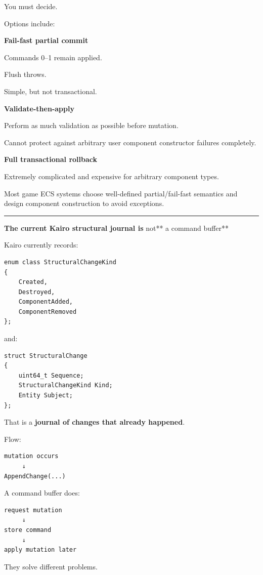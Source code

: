 You must decide.

Options include:

\textbf{Fail-fast partial commit}

Commands 0--1 remain applied.

Flush throws.

Simple, but not transactional.

\textbf{Validate-then-apply}

Perform as much validation as possible before mutation.

Cannot protect against arbitrary user component constructor failures completely.

\textbf{Full transactional rollback}

Extremely complicated and expensive for arbitrary component types.

Most game ECS systems choose well-defined partial/fail-fast semantics and design component construction to avoid exceptions.

\begin{center}\rule{0.5\linewidth}{0.5pt}\end{center}

\textbf{The current Kairo structural journal is }not** a command buffer**

Kairo currently records:

\begin{verbatim}
enum class StructuralChangeKind
{
    Created,
    Destroyed,
    ComponentAdded,
    ComponentRemoved
};
\end{verbatim}

and:

\begin{verbatim}
struct StructuralChange
{
    uint64_t Sequence;
    StructuralChangeKind Kind;
    Entity Subject;
};
\end{verbatim}

That is a \textbf{journal of changes that already happened}.

Flow:

\begin{verbatim}
mutation occurs
     ↓
AppendChange(...)
\end{verbatim}

A command buffer does:

\begin{verbatim}
request mutation
     ↓
store command
     ↓
apply mutation later
\end{verbatim}

They solve different problems.

